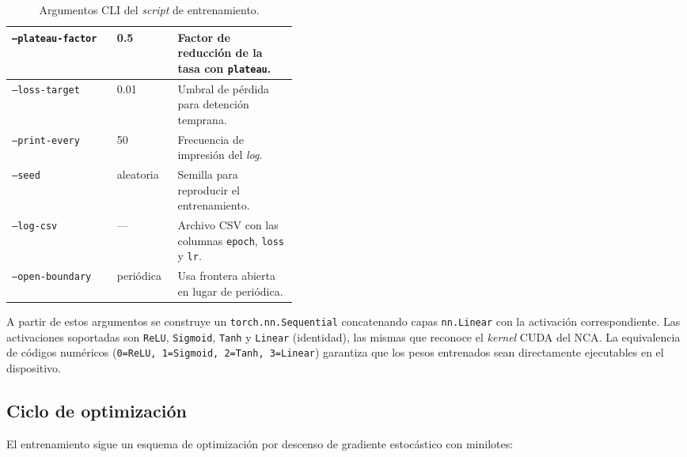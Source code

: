 \begin{table}[H]
\begin{tabular}{l|l|p{0.42\linewidth}}
        \texttt{--plateau-factor} & 0.5 & Factor de reducción de la tasa con \texttt{plateau}. \\ \hline
        \texttt{--loss-target} & 0.01 & Umbral de pérdida para detención temprana. \\ \hline
        \texttt{--print-every} & 50 & Frecuencia de impresión del \textit{log}. \\ \hline
        \texttt{--seed} & aleatoria & Semilla para reproducir el entrenamiento. \\ \hline
        \texttt{--log-csv} & --- & Archivo CSV con las columnas \texttt{epoch}, \texttt{loss} y \texttt{lr}. \\ \hline
        \texttt{--open-boundary} & periódica & Usa frontera abierta en lugar de periódica. \\ \hline
    \end{tabular}
    \normalsize
    \caption{Argumentos CLI del \textit{script} de entrenamiento.}
    \label{tab:cli-entrenamiento}
\end{table}

A partir de estos argumentos se construye un \texttt{torch.nn.Sequential} concatenando capas \texttt{nn.Linear} con la activación correspondiente. Las activaciones soportadas son \texttt{ReLU}, \texttt{Sigmoid}, \texttt{Tanh} y \texttt{Linear} (identidad), las mismas que reconoce el \textit{kernel} CUDA del NCA. La equivalencia de códigos numéricos (\texttt{0=ReLU, 1=Sigmoid, 2=Tanh, 3=Linear}) garantiza que los pesos entrenados sean directamente ejecutables en el dispositivo.

\subsection{Ciclo de optimización}

El entrenamiento sigue un esquema de optimización por descenso de gradiente estocástico con minilotes:

